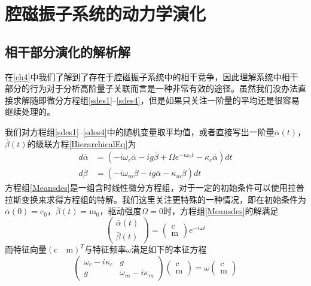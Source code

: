 
\chapter{腔磁振子系统的动力学演化}
\label{ch5}

\section{相干部分演化的解析解}
在\ref{ch4}中我们了解到了存在于腔磁振子系统中的相干竞争，因此理解系统中相干部分的行为对于分析高阶量子关联而言是一种非常有效的途径。虽然我们没办法直接求解随即微分方程组\eqref{sdes1}--\eqref{sdes4}，但是如果只关注一阶量的平均还是很容易继续处理的。

我们对方程组\eqref{sdes1}--\eqref{sdes4}中的随机变量取平均值，或者直接写出一阶量$\overline{\alpha}(t)$，$\overline{\beta}(t)$的级联方程\ref{HierarchicalEq}为
\begin{equation}
\begin{aligned}
d{\overline{\alpha}}&=(-i\omega_{c}\overline{\alpha}-ig\overline{\beta}+\Omega e^{-i\omega_{0}t}-\kappa_{c}\overline{\alpha})dt \\
d{\overline{\beta}}&=(-i\omega_{m}\overline{\beta}-ig\overline{\alpha}-\kappa_{m}\overline{\beta})dt 
\end{aligned}\label{Meansdes}
\end{equation}
方程组\eqref{Meansdes}是一组含时线性微分方程组，对于一定的初始条件可以使用拉普拉斯变换来求得方程组的特解。我们这里关注更特殊的一种情况，即在初始条件为$\overline{\alpha}(0)=\mathrm{c}_0$，$\overline{\beta}(t)=\mathrm{m}_0$，驱动强度$\Omega=0$时，方程组\eqref{Meansdes}的解满足
\begin{equation}
\left(\begin{array}{c}
\overline{\alpha}(t) \\
\overline{\beta}(t)
\end{array}\right)=\left(\begin{array}{c}
\mathrm{c} \\
\mathrm{m}
\end{array}\right) e^{-i \omega t}
\label{FormalSolution}
\end{equation}
而特征向量$(\mathrm{c} \quad \mathrm{m})^T$与特征频率$\omega$满足如下的本征方程
\begin{equation}
\left(\begin{array}{cc}
\omega_{c}-i \kappa_{c} & g \\
g & \omega_{m}-i \kappa_{m}
\end{array}\right)\left(\begin{array}{c}
\mathrm{c} \\
\mathrm{m}
\end{array}\right)=\omega\left(\begin{array}{l}
\mathrm{c} \\
\mathrm{m}
\end{array}\right)
\end{equation}
